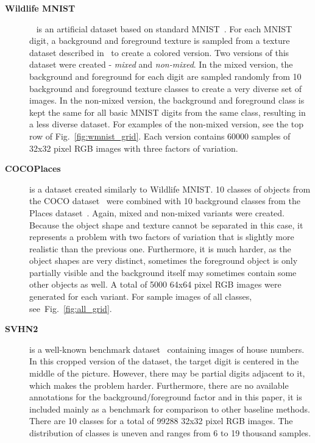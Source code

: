 \begin{description}
    \item[\textbf{Wildlife MNIST}]~\cite{sauer2021counterfactual} is an artificial dataset based on standard MNIST~\cite{lecun2010mnist}. For each MNIST digit, a background and foreground texture is sampled from a texture dataset described in~\cite{cimpoi2014describing} to create a colored version. Two versions of this dataset were created - \textit{mixed} and \textit{non-mixed}. In the mixed version, the background and foreground for each digit are sampled randomly from 10 background and foreground texture classes to create a very diverse set of images. In the non-mixed version, the background and foreground class is kept the same for all basic MNIST digits from the same class, resulting in a less diverse dataset. For examples of the non-mixed version, see the top row of Fig.~\ref{fig:wmnist_grid}. Each version contains 60000 samples of 32x32 pixel RGB images with three factors of variation.
    
    \item[\textbf{COCOPlaces}] is a dataset created similarly to Wildlife MNIST. 10 classes of objects from the COCO dataset~\cite{lin2014microsoft} were combined with 10 background classes from the Places dataset~\cite{zhou2017places}. Again, mixed and non-mixed variants were created. Because the object shape and texture cannot be separated in this case, it represents a problem with two factors of variation that is slightly more realistic than the previous one. Furthermore, it is much harder, as the object shapes are very distinct, sometimes the foreground object is only partially visible and the background itself may sometimes contain some other objects as well. A total of 5000 64x64 pixel RGB images were generated for each variant. For sample images of all classes, see~Fig.~\ref{fig:all_grid}.

    \item[\textbf{SVHN2}] is a well-known benchmark dataset~\cite{netzer2011reading} containing images of house numbers. In this cropped version of the dataset, the target digit is centered in the middle of the picture. However, there may be partial digits adjacent to it, which makes the problem harder. Furthermore, there are no available annotations for the background/foreground factor and in this paper, it is included mainly as a benchmark for comparison to other baseline methods. There are 10 classes for a total of 99288 32x32 pixel RGB images. The distribution of classes is uneven and ranges from 6 to 19 thousand samples. 
    

\end{description}
